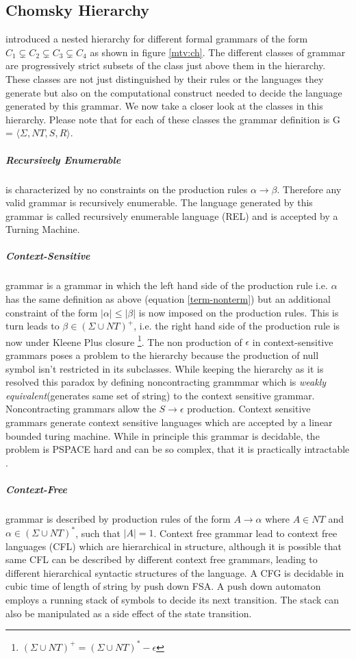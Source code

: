 \subsection{Chomsky Hierarchy}\label{flt:ch}
\cite{Chomsky1956} introduced a nested hierarchy for different formal grammars of the form $C_1 \subsetneq C_2 \subsetneq C_3 \subsetneq C_4$ as shown in figure \ref{mtv:ch}. The different classes of grammar are progressively strict subsets of the class just above them in the hierarchy. These classes are not just distinguished by their rules or the languages they generate but also on the computational construct needed to decide the language generated by this grammar. We now take a closer look at the classes in this hierarchy. Please note that for each of these classes the grammar definition is G = $\langle \Sigma, NT, S, R \rangle$.
\subparagraph{Recursively Enumerable} is characterized by no constraints on the production rules $\alpha \rightarrow \beta$. Therefore any valid grammar is recursively enumerable. The language generated by this grammar is called recursively enumerable language (REL) and is accepted by a Turning Machine.
\subparagraph{Context-Sensitive} grammar is a grammar in which the left hand side of the production rule i.e. $\alpha$ has the same definition as above (equation \ref{term-nonterm}) but an additional constraint of the form $|\alpha| \leq |\beta|$ is now imposed on the production rules. This is turn leads to $\beta \in (\Sigma \cup NT)^{+}$, i.e. the right hand side of the production rule is now under Kleene Plus closure \footnote{$(\Sigma \cup NT)^{+} = (\Sigma \cup NT)^{*} - \epsilon$}. The non production of $\epsilon$ in context-sensitive grammars poses a problem to the hierarchy because the production of null symbol isn't restricted in its subclasses. While keeping the hierarchy as it is \cite{Chomsky1963} resolved this paradox by defining noncontracting grammmar which is \textit{weakly equivalent}(generates same set of string) to the context sensitive grammar. Noncontracting grammars allow the $S \rightarrow \epsilon$ production. Context sensitive grammars generate context sensitive languages which are accepted by a linear bounded turing machine. While in principle this grammar is decidable, the problem is PSPACE hard and can be so complex, that it is practically intractable \citep{Jager2012}. 
\subparagraph{Context-Free} grammar is described by production rules of the form $A \rightarrow \alpha$ where $A \in NT$ and $\alpha \in (\Sigma \cup NT)^{*}$, such that $|A|=1$.  Context free grammar lead to context free languages (CFL) which are hierarchical in structure, although it is possible that same CFL can be described by different context free grammars, leading to different hierarchical syntactic structures of the language. A CFG is decidable in cubic time of length of string by push down FSA. A push down automaton employs a running stack of symbols to decide its next transition. The stack can also be manipulated as a side effect of the state transition.
